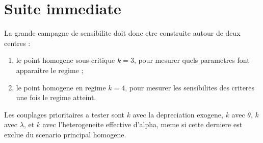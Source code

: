 \documentclass[11pt,a4paper]{article}
\begin{document}
\section{Suite immediate}

La grande campagne de sensibilite doit donc etre construite autour de deux
centres :

\begin{enumerate}
  \item le point homogene sous-critique \(k=3\), pour mesurer quels parametres
  font apparaitre le regime ;
  \item le point homogene en regime \(k=4\), pour mesurer les sensibilites des
  criteres une fois le regime atteint.
\end{enumerate}

Les couplages prioritaires a tester sont \(k\) avec la depreciation exogene,
\(k\) avec \(\theta\), \(k\) avec \(\lambda\), et \(k\) avec l'heterogeneite
effective d'alpha, meme si cette derniere est exclue du scenario principal
homogene.
\end{document}
